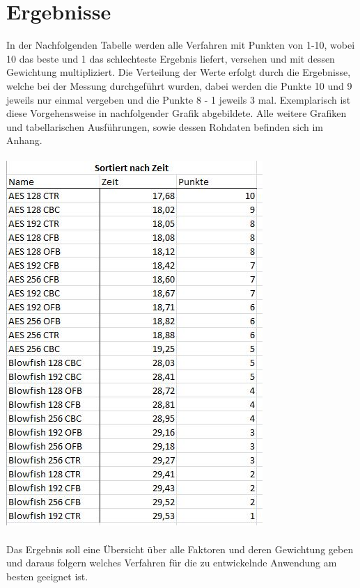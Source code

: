 \documentclass[10pt, a4paper,headsepline]{scrreprt}
\begin{document}
\section{Ergebnisse}
In der Nachfolgenden Tabelle werden alle Verfahren mit Punkten von 1-10, wobei 10 das beste und 1 das schlechteste Ergebnis liefert, versehen und mit dessen Gewichtung multipliziert. Die Verteilung der Werte erfolgt durch die Ergebnisse, welche bei der Messung durchgeführt wurden, dabei werden die Punkte 10 und 9 jeweils nur einmal vergeben und die Punkte 8 - 1 jeweils 3 mal. Exemplarisch ist diese Vorgehensweise in nachfolgender Grafik abgebildete. Alle weitere Grafiken und tabellarischen Ausführungen, sowie dessen Rohdaten befinden sich im Anhang. \\ \\
\includegraphics[scale=0.8]{tabelle_zeitvergleich_punkte.JPG} \\ \\
Das Ergebnis soll eine Übersicht über alle Faktoren und deren Gewichtung geben und daraus folgern welches Verfahren für die zu entwickelnde Anwendung am besten geeignet ist. \\ \\
\end{document}
